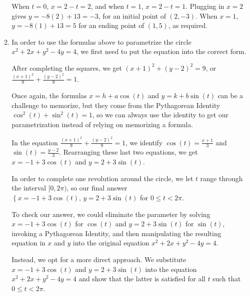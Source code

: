 \documentclass{ximera}
\begin{document}
\begin{ex}
\begin{enumerate}
     When $t=0$, $x= 2-t = 2$, and  when $t=1$, $x = 2-t = 1$.  Plugging in $x=2$ gives $y = -8(2)+13 = -3$, for an initial point of $(2,-3)$.  When  $x = 1$,  $y = -8(1)+13 = 5$ for an ending point of $(1,5)$, as required.

\item In order to use the formulas above to parametrize the circle $x^2 + 2x + y^2 - 4y = 4$, we first need to put the equation into the correct form.  

\smallskip

After completing the squares, we get $(x+1)^2+(y-2)^2 = 9$, or $\frac{(x+1)^2}{9} + \frac{(y-2)^2}{9} = 1$.  

\smallskip

Once again, the formulas $x = h+a\cos(t)$ and $y=k+b\sin(t)$ can be a challenge to memorize, but they come from the Pythagorean Identity $\cos^{2}(t) + \sin^{2}(t) = 1$, so we can always use the identity to get our parametrization instead of relying on memorizing a formula.

\smallskip

In the equation $\frac{(x+1)^2}{9} + \frac{(y-2)^2}{9} = 1$, we identify $\cos(t) = \frac{x+1}{3}$ and $\sin(t) = \frac{y-2}{3}$.  Rearranging these last two equations, we get $x = -1+3 \cos(t)$ and $y = 2 +3 \sin(t)$.  

\smallskip

 In order to complete one revolution around the circle, we let $t$ range through the interval $[0,2\pi)$, so   our final answer $\left\{ x = -1+3 \cos(t), \, y = 2 +3 \sin(t) \right.$ for $0 \leq t < 2\pi$.  
 
 \smallskip
 
 To check our answer, we could eliminate the parameter by solving  $x = -1+3\cos(t)$ for $\cos(t)$ and $y = 2+3\sin(t)$ for $\sin(t)$, invoking a Pythagorean Identity, and then manipulating the resulting equation in $x$ and $y$ into the original equation  $x^2+2x+y^2-4y = 4$.  
 
 \smallskip
 
 Instead, we opt for a more direct approach.  We substitute $x = -1+3\cos(t)$ and $y = 2+3\sin(t)$ into the equation $x^2 + 2x + y^2 - 4y = 4$ and show that the latter is satisfied for all $t$ such that $0 \leq t < 2\pi$.

\[ \begin{array}{rcl}


\end{array}\]
\end{enumerate}
\end{ex}
\end{document}

